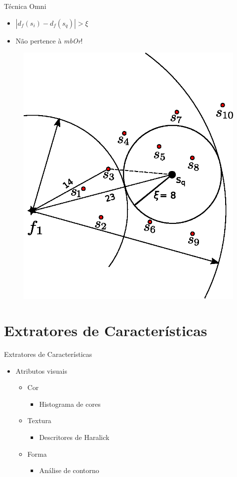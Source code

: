\documentclass{beamer}
\begin{document}
\begin{frame}{Técnica Omni}
	\begin{itemize}
	 \item $|d_f(s_i) - d_f(s_q)| > \xi$\newline
	 \item Não pertence à \textit{mbOr}!
	\end{itemize}

	\begin{figure}[H]
			\centering
			\includegraphics[width=.4\textwidth]{rg_ex2.eps}
	\end{figure}

\end{frame}

\section{Extratores de Características}

\begin{frame}{Extratores de Características}
  \begin{itemize}
   \item Atributos visuais\newline
   \begin{itemize}
      \item Cor
	  \begin{itemize}
	      \item Histograma de cores\newline
	  \end{itemize}
      \item Textura
	  \begin{itemize}
	      \item Descritores de Haralick\newline
	  \end{itemize}
      \item Forma
	  \begin{itemize}
	      \item Análise de contorno\newline
	  \end{itemize}
   \end{itemize}
   
  \end{itemize}

\end{frame}
\end{document}
